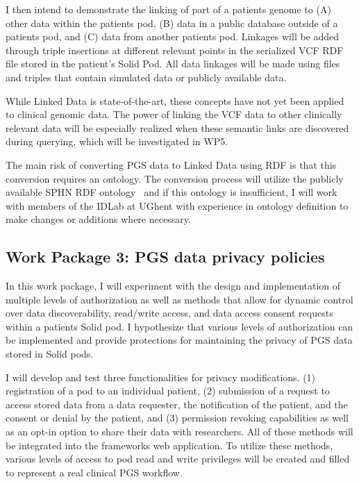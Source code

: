 \documentclass[runningheads]{llncs}
\begin{document}
I then intend to demonstrate the linking of part of a patient\textquotesingle s genome to
(A) other data within the patient\textquotesingle s pod, 
(B) data in a public database outside of a patient\textquotesingle s pod, and
(C) data from another patient\textquotesingle s pod.
Linkages will be added through triple insertions at different relevant points in the serialized VCF RDF file stored in the patient's Solid Pod.
All data linkages will be made using files and triples that contain simulated data or publicly available data.

While Linked Data is state-of-the-art, these concepts have not yet been applied to clinical genomic data.
The power of linking the VCF data to other clinically relevant data will be especially realized when these semantic links are discovered during querying, which will be investigated in WP5. 

The main risk of converting PGS data to Linked Data using RDF is that this conversion requires an ontology. 
The conversion process will utilize the publicly available SPHN RDF ontology~\cite{van_der_horst_bridging_2023} and if this ontology is insufficient, I will work with members of the IDLab at UGhent with experience in ontology definition to make changes or additions where necessary.


\subsection{Work Package 3: PGS data privacy policies}

In this work package, I will experiment with the design and implementation of multiple levels of authorization as well as methods that allow for dynamic control over data discoverability, read/write access, and data access consent requests within a patient\textquotesingle s Solid pod. 
I hypothesize that various levels of authorization can be implemented and provide protections for maintaining the privacy of PGS data stored in Solid pods.

I will develop and test three functionalities for privacy modifications.
(1) registration of a pod to an individual patient,
(2) submission of a request to access stored data from a data requester, the notification of the patient, and the consent or denial by the patient, and
(3) permission revoking capabilities as well as an opt-in option to share their data with researchers. 
All of these methods will be integrated into the framework\textquotesingle s web application.
To utilize these methods, various levels of access to pod read and write privileges will be created and filled to represent a real clinical PGS workflow. 
\end{document}
